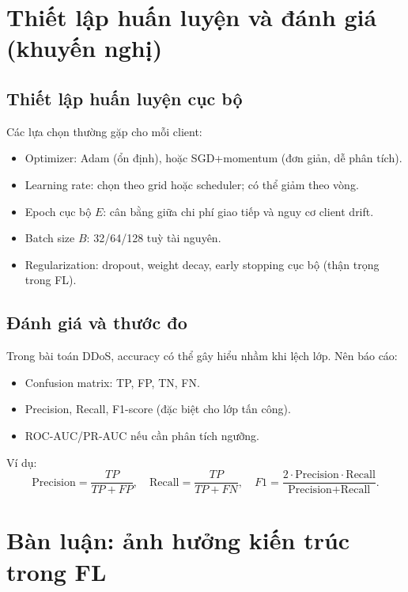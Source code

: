 \documentclass[12pt,a4paper]{article}
\begin{document}
\section{Thiết lập huấn luyện và đánh giá (khuyến nghị)}

\subsection{Thiết lập huấn luyện cục bộ}
Các lựa chọn thường gặp cho mỗi client:
\begin{itemize}
    \item Optimizer: Adam (ổn định), hoặc SGD+momentum (đơn giản, dễ phân tích).
    \item Learning rate: chọn theo grid hoặc scheduler; có thể giảm theo vòng.
    \item Epoch cục bộ $E$: cân bằng giữa chi phí giao tiếp và nguy cơ client drift.
    \item Batch size $B$: 32/64/128 tuỳ tài nguyên.
    \item Regularization: dropout, weight decay, early stopping cục bộ (thận trọng trong FL).
\end{itemize}

\subsection{Đánh giá và thước đo}
Trong bài toán DDoS, accuracy có thể gây hiểu nhầm khi lệch lớp. Nên báo cáo:
\begin{itemize}
    \item Confusion matrix: TP, FP, TN, FN.
    \item Precision, Recall, F1-score (đặc biệt cho lớp tấn công).
    \item ROC-AUC/PR-AUC nếu cần phân tích ngưỡng.
\end{itemize}

Ví dụ:
\[
\text{Precision}=\frac{TP}{TP+FP},\quad
\text{Recall}=\frac{TP}{TP+FN},\quad
F1=\frac{2\cdot \text{Precision}\cdot \text{Recall}}{\text{Precision}+\text{Recall}}.
\]

\section{Bàn luận: ảnh hưởng kiến trúc trong FL}
\end{document}
